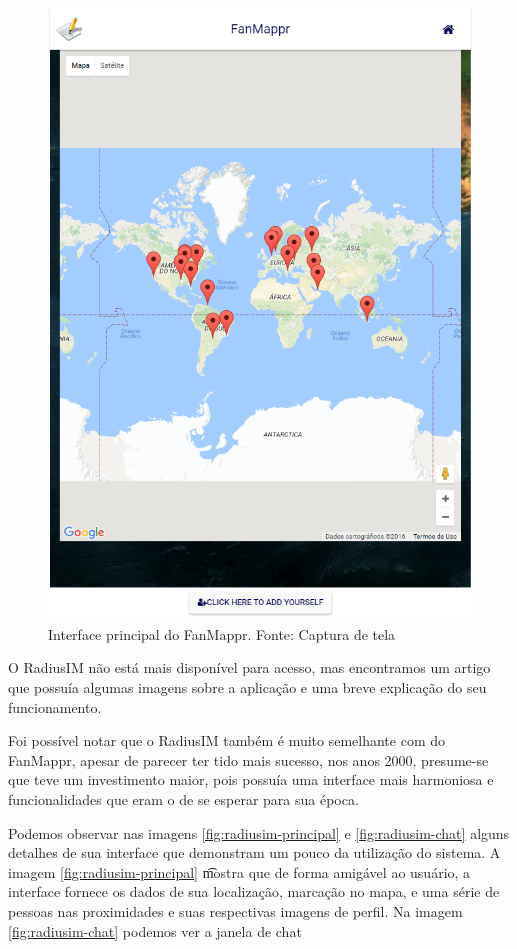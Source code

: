 \begin{figure}[H]
	\centering
	\includegraphics[scale=0.33]{imagens/fanmappr.png}
	\caption{\small Interface principal do FanMappr. Fonte: Captura de tela}
	\label{fig:fanmappr-principal}
\end{figure}

O RadiusIM não está mais disponível para acesso, mas encontramos um artigo \cite{radiusim} que possuía algumas imagens sobre a aplicação e uma breve explicação do seu funcionamento.

Foi possível notar que o RadiusIM também é muito semelhante com do FanMappr, apesar de parecer ter tido mais sucesso, nos anos 2000, presume-se que teve um investimento maior, pois possuía uma interface mais harmoniosa e funcionalidades que eram o de se esperar para sua época.

Podemos observar nas imagens \ref{fig:radiusim-principal} e \ref{fig:radiusim-chat} alguns detalhes de sua interface que demonstram um pouco da utilização do sistema. A imagem \ref{fig:radiusim-principal} \t mostra que de forma amigável ao usuário, a interface fornece os dados de sua localização, marcação no mapa, e uma série de pessoas nas proximidades e suas respectivas imagens de perfil. Na imagem \ref{fig:radiusim-chat} podemos ver a janela de chat 

